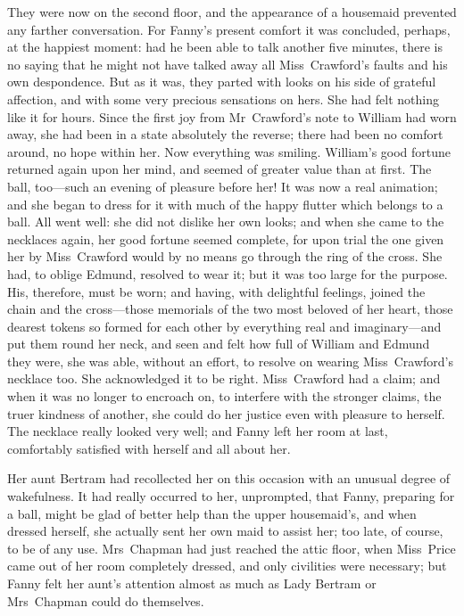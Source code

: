 They were now on the second floor, and the appearance of a housemaid prevented any farther conversation. For Fanny's present comfort it was concluded, perhaps, at the happiest moment: had he been able to talk another five minutes, there is no saying that he might not have talked away all Miss~Crawford's faults and his own despondence. But as it was, they parted with looks on his side of grateful affection, and with some very precious sensations on hers. She had felt nothing like it for hours. Since the first joy from Mr~Crawford's note to William had worn away, she had been in a state absolutely the reverse; there had been no comfort around, no hope within her. Now everything was smiling. William's good fortune returned again upon her mind, and seemed of greater value than at first. The ball, too—such an evening of pleasure before her! It was now a real animation; and she began to dress for it with much of the happy flutter which belongs to a ball. All went well: she did not dislike her own looks; and when she came to the necklaces again, her good fortune seemed complete, for upon trial the one given her by Miss~Crawford would by no means go through the ring of the cross. She had, to oblige Edmund, resolved to wear it; but it was too large for the purpose. His, therefore, must be worn; and having, with delightful feelings, joined the chain and the cross—those memorials of the two most beloved of her heart, those dearest tokens so formed for each other by everything real and imaginary—and put them round her neck, and seen and felt how full of William and Edmund they were, she was able, without an effort, to resolve on wearing Miss~Crawford's necklace too. She acknowledged it to be right. Miss~Crawford had a claim; and when it was no longer to encroach on, to interfere with the stronger claims, the truer kindness of another, she could do her justice even with pleasure to herself. The necklace really looked very well; and Fanny left her room at last, comfortably satisfied with herself and all about her.

Her aunt Bertram had recollected her on this occasion with an unusual degree of wakefulness. It had really occurred to her, unprompted, that Fanny, preparing for a ball, might be glad of better help than the upper housemaid's, and when dressed herself, she actually sent her own maid to assist her; too late, of course, to be of any use. Mrs~Chapman had just reached the attic floor, when Miss~Price came out of her room completely dressed, and only civilities were necessary; but Fanny felt her aunt's attention almost as much as Lady Bertram or Mrs~Chapman could do themselves. 